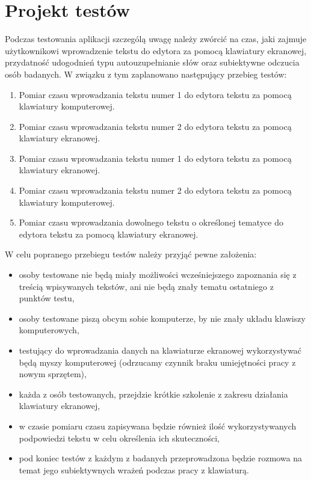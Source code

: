 \documentclass[twoside,a4paper]{book}
\begin{document}
\section{Projekt testów} \label{sec:testsP}
Podczas testowania aplikacji szczególą uwagę należy zwórcić na czas, jaki zaj\-mu\-je użytkownikowi wprowadzenie tekstu do edytora za pomocą klawiatury ekranowej, przydatność udogodnień typu autouzupełnianie słów oraz subiektywne odczucia osób badanych. W związku z tym zaplanowano następujący przebieg testów:
\begin{enumerate}
\item Pomiar czasu wprowadzania tekstu numer 1 do edytora tekstu za pomocą klawiatury komputerowej. 
\item Pomiar czasu wprowadzania tekstu numer 2 do edytora tekstu za pomocą klawiatury ekranowej. 
\item Pomiar czasu wprowadzania tekstu numer 1 do edytora tekstu za pomocą klawiatury ekranowej. 
\item Pomiar czasu wprowadzania tekstu numer 2 do edytora tekstu za pomocą klawiatury komputerowej.
\item Pomiar czasu wprowadzania dowolnego tekstu o określonej tematyce do edytora tekstu za pomocą klawiatury ekranowej.  
\end{enumerate}
W celu popranego przebiegu testów należy przyjąć pewne założenia:
\begin{itemize}
\item osoby testowane nie będą miały możliwości wcześniejszego zapoznania się z treścią wpisywanych tekstów, ani nie będą znały tematu ostatniego z punktów testu,    
\item osoby testowane piszą obcym sobie komputerze, by nie znały układu klawiszy komputerowych, 
\item testujący do wprowadzania danych na klawiaturze ekranowej wykorzystywać będą myszy komputerowej (odrzucamy czynnik braku umiejętności pracy z nowym sprzętem),
\item każda z osób testowanych, przejdzie krótkie szkolenie z zakresu działania klawiatury ekranowej,
\item w czasie pomiaru czasu zapisywana będzie również ilość wykorzystywanych podpowiedzi tekstu w celu określenia ich skuteczności,
\item pod koniec testów z każdym z badanych przeprowadzona będzie rozmowa na temat jego subiektywnych wrażeń podczas pracy z klawiaturą.
\end{itemize}
\end{document}
